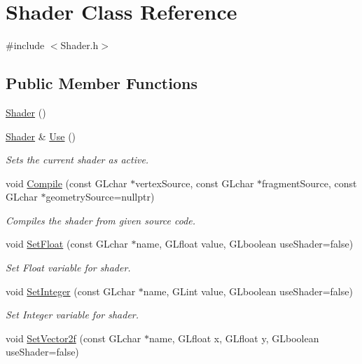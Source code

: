 \hypertarget{class_shader}{}\section{Shader Class Reference}
\label{class_shader}


{\ttfamily \#include $<$Shader.\+h$>$}

\subsection*{Public Member Functions}
\begin{DoxyCompactItemize}
\item 
\mbox{\hyperlink{class_shader_a0d654ebaca4e0555197c0724c6d30610}{Shader}} ()
\item 
\mbox{\hyperlink{class_shader}{Shader}} \& \mbox{\hyperlink{class_shader_a02292f4fdae284b29169db5da29e519a}{Use}} ()
\begin{DoxyCompactList}\small\item\em Sets the current shader as active. \end{DoxyCompactList}\item 
void \mbox{\hyperlink{class_shader_a4d42d98a025018d7ce564a78ac5b921e}{Compile}} (const G\+Lchar $\ast$vertex\+Source, const G\+Lchar $\ast$fragment\+Source, const G\+Lchar $\ast$geometry\+Source=nullptr)
\begin{DoxyCompactList}\small\item\em Compiles the shader from given source code. \end{DoxyCompactList}\item 
void \mbox{\hyperlink{class_shader_af08ebcd8cd00553bce2134a476187496}{Set\+Float}} (const G\+Lchar $\ast$name, G\+Lfloat value, G\+Lboolean use\+Shader=false)
\begin{DoxyCompactList}\small\item\em Set Float variable for shader. \end{DoxyCompactList}\item 
void \mbox{\hyperlink{class_shader_a2c362029c73289761529a5d8b9d6a6b3}{Set\+Integer}} (const G\+Lchar $\ast$name, G\+Lint value, G\+Lboolean use\+Shader=false)
\begin{DoxyCompactList}\small\item\em Set Integer variable for shader. \end{DoxyCompactList}\item 
void \mbox{\hyperlink{class_shader_a6f0213e1a40b9ee631f4154da22f6f52}{Set\+Vector2f}} (const G\+Lchar $\ast$name, G\+Lfloat x, G\+Lfloat y, G\+Lboolean use\+Shader=false)

\end{DoxyCompactItemize}
